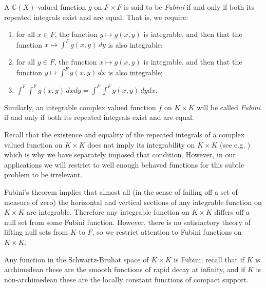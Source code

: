 \documentclass{lmsMODIFIED}
\newcommand{\bb}[1]{\mathbb{#1}}
\begin{document}
\begin{definition}
A $\bb{C}(X)$-valued function $g$ on $F\times F$ is said to be \emph{Fubini} if and only if both its repeated integrals exist and are equal. That is, we require: 
\begin{enumerate}
\item for all $x\in F$, the function $y\mapsto g(x,y)$ is integrable, and then that the function $x\mapsto \int^F g(x,y)\,dy$ is also integrable;
\item for all $y\in F$, the function $x\mapsto g(x,y)$ is integrable, and then that the function $y\mapsto \int^F g(x,y)\,dx$ is also integrable;
\item $\int^F\int^F g(x,y)\,dxdy = \int^F\int^F g(x,y)\,dydx$.
\end{enumerate}
Similarly, an integrable complex valued function $f$ on $K\times K$ will be called \emph{Fubini} if and only if both its repeated integrals exist and are equal.
\end{definition}

\begin{remark}
Recall that the existence and equality of the repeated integrals of a complex valued function on $K\times K$ does not imply its integrability on $K\times K$ (see e.g. \cite[example 8.9c]{Rudin1987}) which is why we have separately imposed that condition. However, in our applications we will restrict to well enough behaved functions for this subtle problem to be irrelevant.

Fubini's theorem implies that almost all (in the sense of failing off a set of measure of zero) the horizontal and vertical sections of any integrable function on $K\times K$ are integrable. Therefore any integrable function on $K\times K$ differs off a null set from some Fubini function. However, there is no satisfactory theory of lifting null sets from $K$ to $F$, so we restrict attention to Fubini functions on $K\times K$.

Any function in the Schwartz-Bruhat space of $K\times K$ is Fubini; recall that if $K$ is archimedean these are the smooth functions of rapid decay at infinity, and if $K$ is non-archimedean these are the locally constant functions of compact support.
\end{remark}
\end{document}
